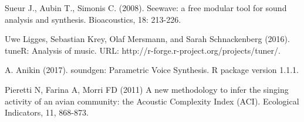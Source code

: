 
\begin{thebibliography}{00}
Sueur J., Aubin T., Simonis C. (2008). 
\newblock Seewave: a free modular tool for sound analysis and synthesis. 
\newblock Bioacoustics, 18: 213-226.

Uwe Ligges, Sebastian Krey, Olaf Mersmann, and Sarah Schnackenberg (2016). 
\newblock tuneR: Analysis of music. 
\newblock URL: http://r-forge.r-project.org/projects/tuner/.

A. Anikin (2017). 
\newblock soundgen: Parametric Voice Synthesis. 
\newblock R package version 1.1.1.

Pieretti N, Farina A, Morri FD (2011) 
\newblock A new methodology to infer the singing activity of an avian community: the Acoustic Complexity Index (ACI). 
\newblock Ecological Indicators, 11, 868-873.
\end{thebibliography}


